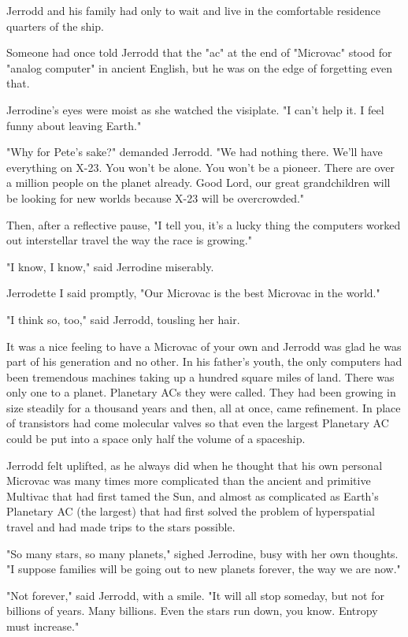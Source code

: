 \documentclass[11pt]{article}
\begin{document}
Jerrodd and his family had only to wait and live in the comfortable residence quarters of the ship.

Someone had once told Jerrodd that the "ac" at the end of "Microvac" stood for "analog computer" in ancient English, but he was on the edge of forgetting even that.

Jerrodine's eyes were moist as she watched the visiplate. "I can't help it. I feel funny about leaving Earth."

"Why for Pete's sake?" demanded Jerrodd. "We had nothing there. We'll have everything on X-23. You won't be alone. You won't be a pioneer. There are over a million people on the planet already. Good Lord, our great grandchildren will be looking for new worlds because X-23 will be overcrowded."

Then, after a reflective pause, "I tell you, it's a lucky thing the computers worked out interstellar travel the way the race is growing."

"I know, I know," said Jerrodine miserably.

Jerrodette I said promptly, "Our Microvac is the best Microvac in the world."

"I think so, too," said Jerrodd, tousling her hair.

It was a nice feeling to have a Microvac of your own and Jerrodd was glad he was part of his generation and no other. In his father's youth, the only computers had been tremendous machines taking up a hundred square miles of land. There was only one to a planet. Planetary ACs they were called. They had been growing in size steadily for a thousand years and then, all at once, came refinement. In place of transistors had come molecular valves so that even the largest Planetary AC could be put into a space only half the volume of a spaceship.

Jerrodd felt uplifted, as he always did when he thought that his own personal Microvac was many times more complicated than the ancient and primitive Multivac that had first tamed the Sun, and almost as complicated as Earth's Planetary AC (the largest) that had first solved the problem of hyperspatial travel and had made trips to the stars possible.

"So many stars, so many planets," sighed Jerrodine, busy with her own thoughts. "I suppose families will be going out to new planets forever, the way we are now."

"Not forever," said Jerrodd, with a smile. "It will all stop someday, but not for billions of years. Many billions. Even the stars run down, you know. Entropy must increase."
\end{document}
